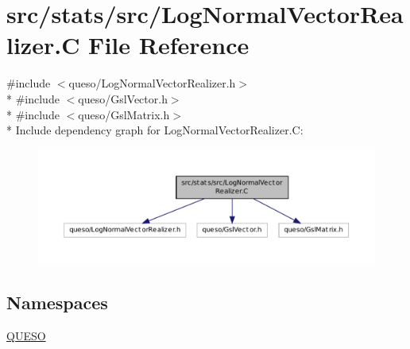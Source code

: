 \hypertarget{_log_normal_vector_realizer_8_c}{\section{src/stats/src/\-Log\-Normal\-Vector\-Realizer.C File Reference}
\label{_log_normal_vector_realizer_8_c}
}
{\ttfamily \#include $<$queso/\-Log\-Normal\-Vector\-Realizer.\-h$>$}\\*
{\ttfamily \#include $<$queso/\-Gsl\-Vector.\-h$>$}\\*
{\ttfamily \#include $<$queso/\-Gsl\-Matrix.\-h$>$}\\*
Include dependency graph for Log\-Normal\-Vector\-Realizer.\-C\-:
\nopagebreak
\begin{figure}[H]
\begin{center}
\leavevmode
\includegraphics[width=350pt]{_log_normal_vector_realizer_8_c__incl}
\end{center}
\end{figure}
\subsection*{Namespaces}
\begin{DoxyCompactItemize}
\item 
\hyperlink{namespace_q_u_e_s_o}{Q\-U\-E\-S\-O}
\end{DoxyCompactItemize}
